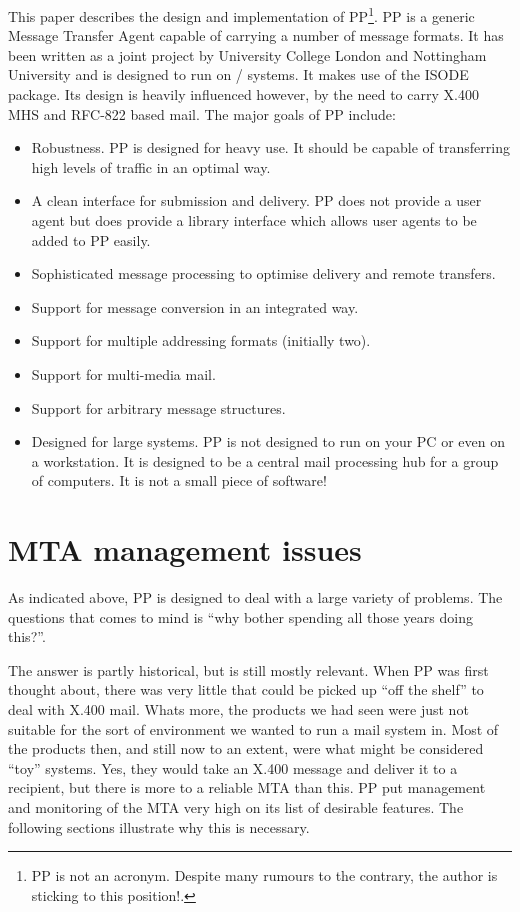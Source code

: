 This paper describes the design and implementation of PP\footnote{PP
is not an acronym. Despite many rumours to the contrary, the author is
sticking to this position!.}. PP is a generic Message Transfer Agent
capable of carrying a number of message formats. It has been written
as a joint project by University College London and Nottingham
University and is designed to run on \unix/ systems. It makes
use of the ISODE package\cite{ISODE}.  Its design is heavily
influenced however, by the need to carry X.400 MHS\cite{CCITT.MHS} and
RFC-822\cite{RFC822} based mail. The major goals of PP include:
\begin{itemize}
\item	Robustness. PP is designed for heavy use. It should be
capable of transferring high levels of traffic in an optimal way.

\item	A clean interface for submission and delivery. PP does not
provide a user agent but does provide a library interface which allows
user agents to be added to PP easily.

\item	Sophisticated message processing to optimise delivery and
remote transfers.

\item	Support for message conversion in an integrated way.

\item	Support for multiple addressing formats (initially two).

\item	Support for multi-media mail.

\item	Support for arbitrary message structures.

\item	Designed for large systems. PP is not designed to run on your
PC or even on a workstation. It is designed to be a central mail
processing hub for a group of computers. It is not a small piece of
software!
\end{itemize}

\section{MTA management issues}
As indicated above, PP is designed to deal with a large variety of
problems. The questions that comes to mind is ``why bother spending
all those years doing this?''. 

The answer is partly historical, but is still mostly relevant. When PP
was first thought about, there was very little that could be picked up
``off the shelf'' to deal with X.400 mail. Whats more, the products we
had seen were just not suitable for the sort of environment we wanted
to run a mail system in. Most of the products then, and still now to
an extent, were what might be considered ``toy'' systems. Yes, they
would take an X.400 message and deliver it to a recipient, but there
is more to a reliable MTA than this. PP put management and monitoring
of the MTA very high on its list of desirable features. The following
sections illustrate why this is necessary.

